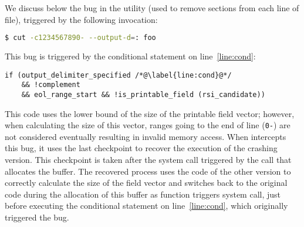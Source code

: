 We discuss below the bug in the \cut utility (used to remove sections from each
line of file), triggered by the following invocation:

\begin{lstlisting}[numbers=none,breaklines=true,xleftmargin=0pt,language=bash]
$ cut -c1234567890- --output-d=: foo
\end{lstlisting}

This bug is triggered by the conditional statement on line~\ref{line:cond}:

\begin{lstlisting}[firstnumber=525]
if (output_delimiter_specified /*@\label{line:cond}@*/
    && !complement
    && eol_range_start && !is_printable_field (rsi_candidate))
\end{lstlisting}

This code uses the lower bound of the size of the printable field
vector; however, when calculating the size of this vector, ranges going
to the end of line (\ie \lstinline`0-`) are not considered eventually
resulting in invalid memory access. 
When \mx intercepts this bug, it uses the
last checkpoint to recover the execution of the crashing version. This
checkpoint is taken after the  system call triggered by
the  call that allocates the buffer. 
The recovered process uses the code of the other version to correctly
calculate the size of the field vector and switches back to the original
code during the allocation of this buffer as
function  triggers  system call, just
before executing the conditional statement on line~\ref{line:cond},
which originally triggered the bug.


